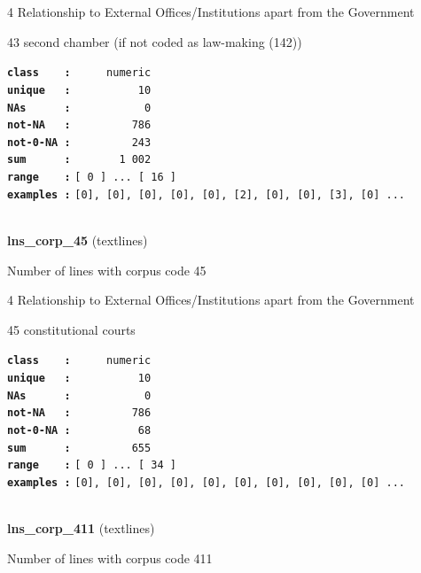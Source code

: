\documentclass[]{article}
\begin{document}
4 Relationship to External Offices/Institutions apart from the
Government

43 second chamber (if not coded as law-making (142))

\textbf{\texttt{class\ \ \ \ :}} \texttt{~~~~~numeric}\\
\textbf{\texttt{unique\ \ \ :}} \texttt{~~~~~~~~~~10}\\
\textbf{\texttt{NAs\ \ \ \ \ \ :}} \texttt{~~~~~~~~~~~0}\\
\textbf{\texttt{not-NA\ \ \ :}} \texttt{~~~~~~~~~786}\\
\textbf{\texttt{not-0-NA\ :}} \texttt{~~~~~~~~~243}\\
\textbf{\texttt{sum\ \ \ \ \ \ :}} \texttt{~~~~~~~1~002}\\
\textbf{\texttt{range\ \ \ \ :}}
\texttt{{[}\ 0\ {]}\ ...\ {[}\ 16\ {]}}\\
\textbf{\texttt{examples\ :}}
\texttt{{[}0{]},\ {[}0{]},\ {[}0{]},\ {[}0{]},\ {[}0{]},\ {[}2{]},\ {[}0{]},\ {[}0{]},\ {[}3{]},\ {[}0{]}\ ...}\\

~

\textbf{lns\_corp\_45} (textlines)

Number of lines with corpus code 45

4 Relationship to External Offices/Institutions apart from the
Government

45 constitutional courts

\textbf{\texttt{class\ \ \ \ :}} \texttt{~~~~~numeric}\\
\textbf{\texttt{unique\ \ \ :}} \texttt{~~~~~~~~~~10}\\
\textbf{\texttt{NAs\ \ \ \ \ \ :}} \texttt{~~~~~~~~~~~0}\\
\textbf{\texttt{not-NA\ \ \ :}} \texttt{~~~~~~~~~786}\\
\textbf{\texttt{not-0-NA\ :}} \texttt{~~~~~~~~~~68}\\
\textbf{\texttt{sum\ \ \ \ \ \ :}} \texttt{~~~~~~~~~655}\\
\textbf{\texttt{range\ \ \ \ :}}
\texttt{{[}\ 0\ {]}\ ...\ {[}\ 34\ {]}}\\
\textbf{\texttt{examples\ :}}
\texttt{{[}0{]},\ {[}0{]},\ {[}0{]},\ {[}0{]},\ {[}0{]},\ {[}0{]},\ {[}0{]},\ {[}0{]},\ {[}0{]},\ {[}0{]}\ ...}\\

~

\textbf{lns\_corp\_411} (textlines)

Number of lines with corpus code 411
\end{document}
